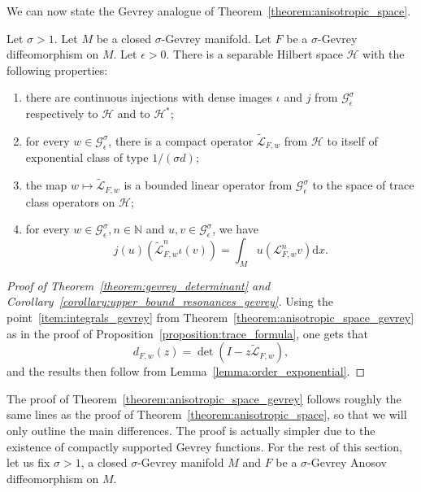 \documentclass[AHL,Unicode,longabstracts,published]{cedram}
\newcommand{\p}[1]{\left(#1\right)}
\newcommand{\clL}{\mathcal{L}}
\newcommand{\clH}{\mathcal{H}}
\newcommand{\clG}{\mathcal{G}}
\newcommand{\bbN}{\mathbb{N}}
\newcommand{\rmd}{\mathrm{d}}
\newcommand*{\romanenumi}{\renewcommand*{\theenumi}{\roman{enumi}}}
\begin{document}
We can now state the Gevrey analogue of Theorem~\ref{theorem:anisotropic_space}.

\begin{theo}\label{theorem:anisotropic_space_gevrey}
Let $\sigma > 1$. Let $M$ be a closed $\sigma$-Gevrey manifold. Let $F$ be a $\sigma$-Gevrey diffeomorphism on $M$. Let $\epsilon > 0$. There is a separable Hilbert space $\clH$ with the following properties:
\begin{enumerate}\romanenumi
\item\label{item:injections_gevrey} there are continuous injections with dense images $\iota$ and $j$ from $\clG^\sigma_\epsilon$ respectively to $\clH$ and to $\clH^*$; 
\item\label{item:extension_operator_gevrey} for every $w \in \clG^\sigma_\epsilon$, there is a compact operator $\widetilde{\clL}_{F,w}$ from $\clH$ to itself of exponential class of type $1/(\sigma d)$; 
\item\label{item:holomorphic_family_gevrey} the map $w \mapsto \widetilde{\clL}_{F,w}$ is a bounded linear operator from $\clG^\sigma_\epsilon$ to the space of trace class operators on $\clH$; 
\item\label{item:integrals_gevrey} for every $w \in \clG^\sigma_\epsilon, n \in \bbN$ and $u,v \in \clG^\sigma_\epsilon$, we have
\begin{equation*}
j(u)\p{\widetilde{\clL}^n_{F,w} \iota(v)} = \int_M u \p{\clL_{F,w}^n v} \rmd x.
\end{equation*}
\end{enumerate}
\end{theo}

\begin{proof}[Proof of Theorem~\ref{theorem:gevrey_determinant} and Corollary~\ref{corollary:upper_bound_resonances_gevrey}]
Using the point~\eqref{item:integrals_gevrey} from Theorem~\ref{theorem:anisotropic_space_gevrey} as in the proof of Proposition~\ref{proposition:trace_formula}, one gets that
\begin{equation*}
d_{F,w}(z) = \det(I - z\widetilde{\clL}_{F,w}),
\end{equation*}
and the results then follow from Lemma~\ref{lemma:order_exponential}.
\end{proof}

The proof of Theorem~\ref{theorem:anisotropic_space_gevrey} follows roughly the same lines as the proof of Theorem~\ref{theorem:anisotropic_space}, so that we will only outline the main differences. The proof is actually simpler due to the existence of compactly supported Gevrey functions. For the rest of this section, let us fix $\sigma > 1$, a closed $\sigma$-Gevrey manifold $M$ and $F$ be a $\sigma$-Gevrey Anosov diffeomorphism on $M$.
\end{document}
